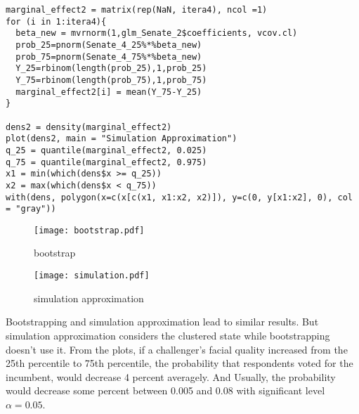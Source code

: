 \documentclass[11pt,english]{article}
\begin{document}
\begin{enumerate}
\begin{verbatim}
marginal_effect2 = matrix(rep(NaN, itera4), ncol =1)
for (i in 1:itera4){
  beta_new = mvrnorm(1,glm_Senate_2$coefficients, vcov.cl)
  prob_25=pnorm(Senate_4_25%*%beta_new)
  prob_75=pnorm(Senate_4_75%*%beta_new)
  Y_25=rbinom(length(prob_25),1,prob_25)
  Y_75=rbinom(length(prob_75),1,prob_75)
  marginal_effect2[i] = mean(Y_75-Y_25)
}

dens2 = density(marginal_effect2)
plot(dens2, main = "Simulation Approximation")
q_25 = quantile(marginal_effect2, 0.025)
q_75 = quantile(marginal_effect2, 0.975)
x1 = min(which(dens$x >= q_25))
x2 = max(which(dens$x < q_75))
with(dens, polygon(x=c(x[c(x1, x1:x2, x2)]), y=c(0, y[x1:x2], 0), col = "gray"))
\end{verbatim}
\begin{figure}[H]
\begin{minipage}[t]{0.5\linewidth}
\centering
\texttt{[image: bootstrap.pdf]}
\caption{bootstrap}
\end{minipage}
\begin{minipage}[t]{0.5\linewidth}
\centering
\texttt{[image: simulation.pdf]}
\caption{simulation approximation}
\end{minipage}
\end{figure}
Bootstrapping and simulation approximation lead to similar results.  But simulation approximation considers the clustered state while bootstrapping doesn't use it.  From the plots, if a challenger's facial quality increased from the 25th percentile to 75th percentile, the probability that respondents voted for the incumbent, would decrease 4 percent averagely.  And Usually, the probability would decrease some percent between 0.005 and 0.08 with significant level $\alpha = 0.05$.


%
%

\end{enumerate}
\end{document}
